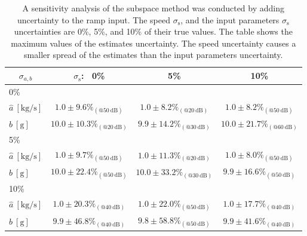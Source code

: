 \begin{table}[h!]
\centering
\caption{ A sensitivity analysis of the subspace method was conducted by adding uncertainty to the ramp input. The speed $\sigma_{\mathrm{s}}$, and the input parameters $\sigma_{\mathrm{s}}$ uncertainties are 0\%, 5\%, and 10\% of their true values. The table shows the maximum values of the estimates uncertainty. The speed uncertainty causes a smaller spread of the estimates than the input parameters uncertainty.}
 
\begin{tabular}{c| c c c} 
\hline  
$\sigma_{{a},{b}}$ & $\sigma_{\mathrm{s}}$: \ 0\% & 5\% & 10\% \\ [0.5ex] 
 \hline
 \multicolumn{1}{l|}{0\%} \\
 \multicolumn{1}{l|}{\hspace{2mm} $\widehat{a} \ \mathrm{[kg/s]}$} & $1.0 \pm 9.6 \%_{(@50 \ \mathrm{dB})}$ &  $1.0 \pm 8.2 \%_{(@20 \ \mathrm{dB})}$ & $1.0 \pm 8.2 \%_{(@50 \ \mathrm{dB})}$ \\ 
 \multicolumn{1}{l|}{\hspace{2mm} $\widehat{b} \ \mathrm{[g]}$} & $10.0 \pm 10.3 \%_{(@20 \ \mathrm{dB})}$ & $9.9 \pm 14.2 \%_{(@30 \ \mathrm{dB})}$ & $10.0 \pm 21.7 \%_{(@60 \ \mathrm{dB})}$ \\ 
 \multicolumn{1}{l|}{5\%} \\
 \multicolumn{1}{l|}{\hspace{2mm} $\widehat{a} \ \mathrm{[kg/s]}$} & $1.0 \pm 9.7 \%_{(@50 \ \mathrm{dB})}$ & $1.0 \pm 11.3 \%_{(@20 \ \mathrm{dB})}$ & $1.0 \pm 8.0 \%_{(@50 \ \mathrm{dB})}$ \\  
 \multicolumn{1}{l|}{\hspace{2mm} $\widehat{b} \ \mathrm{[g]}$} & $10.0 \pm 22.4 \%_{(@50 \ \mathrm{dB})}$ & $10.0 \pm 33.2 \%_{(@30 \ \mathrm{dB})}$ & $9.9 \pm 16.6 \%_{(@50 \ \mathrm{dB})}$ \\ 
\multicolumn{1}{l|}{10\%} \\
\multicolumn{1}{l|}{\hspace{2mm} $\widehat{a} \ \mathrm{[kg/s]}$} & $1.0 \pm 20.3 \%_{(@40 \ \mathrm{dB})}$ & $1.0 \pm 22.0 \%_{(@50 \ \mathrm{dB})}$ & $1.0 \pm 17.7 \%_{(@40 \ \mathrm{dB})}$ \\    
 \multicolumn{1}{l|}{\hspace{2mm} $\widehat{b} \ \mathrm{[g]}$} & $9.9 \pm 46.8 \%_{(@40 \ \mathrm{dB})}$ & $9.8 \pm 58.8 \%_{(@50 \ \mathrm{dB})}$ & $9.9 \pm 41.6 \%_{(@40 \ \mathrm{dB})}$ \\ [0.5ex] 
\hline
\end{tabular}
\label{table:dd_sensitivity}
\end{table}



